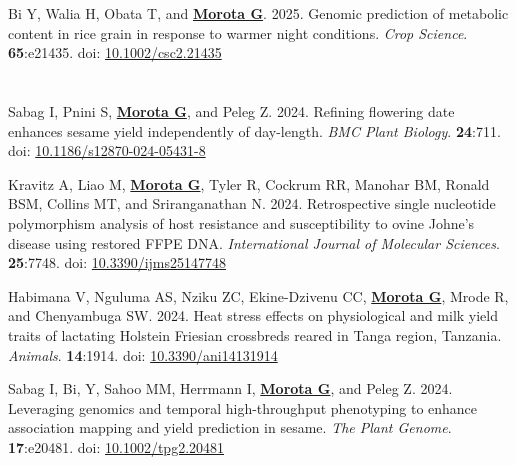 \documentclass[margin,line,10pt]{res}
\newenvironment{list1}{
  \begin{list}{\ding{113}}{%
      \setlength{\itemsep}{0in}
      \setlength{\parsep}{0in} \setlength{\parskip}{0in}
      \setlength{\topsep}{0in} \setlength{\partopsep}{0in} 
      \setlength{\leftmargin}{0.17in}}}{\end{list}}
\begin{document}
\begin{resume}
\begin{list1}
  \vspace{0.5cm}

\item  [{\bf 78}.] Bi Y, Walia H, Obata T, and \textbf{\underline{Morota G}}. 2025. Genomic prediction of metabolic content in rice grain in response to warmer night conditions. \emph{Crop Science}. \textbf{65}:e21435. doi: \textcolor{blue}{\href{https://doi.org/10.1002/csc2.21435}{10.1002/csc2.21435}}

\end{list1}



\section{}
\begin{list1}


  \item  [{\bf 77}.]  Sabag I, Pnini S, \textbf{\underline{Morota G}}, and Peleg Z. 2024. Refining flowering date enhances sesame yield independently of day-length. \emph{BMC Plant Biology}. \textbf{24}:711. doi: \textcolor{blue}{\href{https://doi.org/10.1186/s12870-024-05431-8}{10.1186/s12870-024-05431-8}} 

  \vspace{0.5cm}

  \item  [{\bf 76}.] Kravitz A, Liao M, \textbf{\underline{Morota G}}, Tyler R, Cockrum RR, Manohar BM, Ronald BSM, Collins MT, and Sriranganathan N. 2024. Retrospective single nucleotide polymorphism analysis of host resistance and susceptibility to ovine Johne’s disease using restored FFPE DNA. \emph{International Journal of Molecular Sciences}. \textbf{25}:7748. doi: \textcolor{blue}{\href{https://doi.org/10.3390/ijms25147748}{10.3390/ijms25147748}} 

  \vspace{0.5cm}


  \item  [{\bf 75}.] Habimana V, Nguluma AS, Nziku ZC, Ekine-Dzivenu CC, \textbf{\underline{Morota G}}, Mrode R, and Chenyambuga SW. 2024. Heat stress effects on physiological and milk yield traits of lactating Holstein Friesian crossbreds reared in Tanga region, Tanzania. \emph{Animals}. \textbf{14}:1914. doi: \textcolor{blue}{\href{https://doi.org/10.3390/ani14131914}{10.3390/ani14131914}}

  \vspace{0.5cm}

  \item  [{\bf 74}.] Sabag I, Bi, Y, Sahoo MM, Herrmann I, \textbf{\underline{Morota G}}, and Peleg Z. 2024. Leveraging genomics and temporal high-throughput phenotyping to enhance association mapping and yield prediction in sesame. \emph{The Plant Genome}. \textbf{17}:e20481. doi: \textcolor{blue}{\href{https://doi.org/10.1002/tpg2.20481}{10.1002/tpg2.20481}}
  

\end{list1}
\end{resume}
\end{document}
